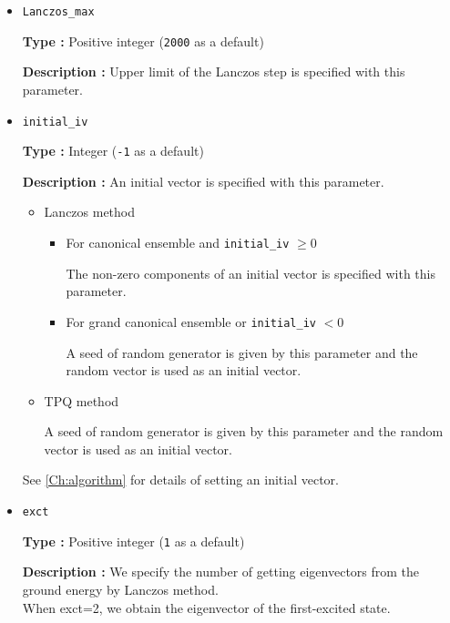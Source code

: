 \begin{itemize}
\item \verb|Lanczos_max|

{\bf Type :} Positive integer (\verb|2000| as a default)

{\bf Description :} Upper limit of the Lanczos step is specified with this parameter.

\item \verb|initial_iv|

{\bf Type :} Integer (\verb|-1| as a default)

{\bf Description :} 
{An initial vector is specified with this parameter.}
\begin{itemize}
\item{Lanczos method}
\begin{itemize}
\item{For canonical ensemble and \verb|initial_iv| $\geq 0$}

The non-zero components of an initial vector is specified with this parameter. 

\item{For grand canonical ensemble or \verb|initial_iv| $< 0$}

A seed of random generator is given by this parameter and the random vector is used as an initial vector.
\end{itemize}

\item{TPQ method}

A seed of random generator is given by this parameter and the random vector is used as an initial vector.
\end{itemize}
See \ref{Ch:algorithm} for details of setting an initial vector.




\item \verb|exct|

{\bf Type :} Positive integer (\verb|1| as a default)

{\bf Description :}  We specify the number of getting eigenvectors from the ground energy by Lanczos method.\\
When exct=2, we obtain the eigenvector of the first-excited state.


\end{itemize}
